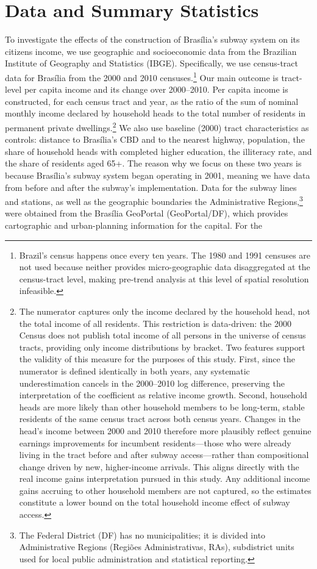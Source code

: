 \section{Data and Summary Statistics}
\label{s:data}

To investigate the effects of the construction of Brasília's subway system on its citizens income, we use geographic and socioeconomic data from the Brazilian Institute of Geography and Statistics (IBGE). Specifically, we use census-tract data for Brasília from the 2000 and 2010 censuses.\footnote{Brazil's census happens once every ten years. The 1980 and 1991 censuses are not used because neither provides micro-geographic data disaggregated at the census-tract level, making pre-trend analysis at this level of spatial resolution infeasible.} Our main outcome is tract-level per capita income and its change over 2000--2010. Per capita income is constructed, for each census tract and year, as the ratio of the sum of nominal monthly income declared by household heads to the total number of residents in permanent private dwellings.\footnote{The numerator captures only the income declared by the household head, not the total income of all residents. This restriction is data-driven: the 2000 Census does not publish total income of all persons in the universe of census tracts, providing only income distributions by bracket. Two features support the validity of this measure for the purposes of this study. First, since the numerator is defined identically in both years, any systematic underestimation cancels in the 2000--2010 log difference, preserving the interpretation of the coefficient as relative income growth. Second, household heads are more likely than other household members to be long-term, stable residents of the same census tract across both census years. Changes in the head's income between 2000 and 2010 therefore more plausibly reflect genuine earnings improvements for incumbent residents---those who were already living in the tract before and after subway access---rather than compositional change driven by new, higher-income arrivals. This aligns directly with the real income gains interpretation pursued in this study. Any additional income gains accruing to other household members are not captured, so the estimates constitute a lower bound on the total household income effect of subway access.} We also use baseline (2000) tract characteristics as controls: distance to Brasília's CBD and to the nearest highway, population, the share of household heads with completed higher education, the illiteracy rate, and the share of residents aged 65+. The reason why we focus on these two years is because Brasília's subway system began operating in 2001, meaning we have data from before and after the subway's implementation. Data for the subway lines and stations, as well as the geographic boundaries the Administrative Regions,\footnote{The Federal District (DF) has no municipalities; it is divided into Administrative Regions (Regiões Administrativas, RAs), subdistrict units used for local public administration and statistical reporting.} were obtained from the Brasília GeoPortal (GeoPortal/DF), which provides cartographic and urban-planning information for the capital. For the 